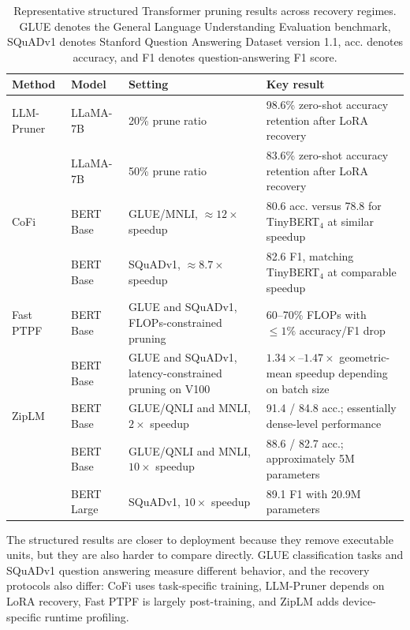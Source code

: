 \begin{table}[H]
	\centering
	\caption{Representative structured Transformer pruning results across recovery regimes. GLUE denotes the General Language Understanding Evaluation benchmark, SQuADv1 denotes Stanford Question Answering Dataset version 1.1, acc. denotes accuracy, and F1 denotes question-answering F1 score.}
	\label{tab:structured_summary}
	\begin{tabular}{@{}llp{4.4cm}p{4.7cm}@{}}
		\toprule
		\textbf{Method} & \textbf{Model} & \textbf{Setting} & \textbf{Key result} \\
		\midrule
		LLM-Pruner \cite{ma2023llmpruner}
		  & LLaMA-7B & 20\% prune ratio & 98.6\% zero-shot accuracy retention after LoRA recovery \\
		  & LLaMA-7B & 50\% prune ratio & 83.6\% zero-shot accuracy retention after LoRA recovery \\
		\midrule
		CoFi \cite{xia2022structured}
		  & BERT Base & GLUE/MNLI, $\approx 12{\times}$ speedup & 80.6 acc. versus 78.8 for TinyBERT$_4$ at similar speedup \\
		  & BERT Base & SQuADv1, $\approx 8.7{\times}$ speedup & 82.6 F1, matching TinyBERT$_4$ at comparable speedup \\
		\midrule
		Fast PTPF \cite{kwon2022fast}
		  & BERT Base & GLUE and SQuADv1, FLOPs-constrained pruning & 60--70\% FLOPs with $\leq 1\%$ accuracy/F1 drop \\
		  & BERT Base & GLUE and SQuADv1, latency-constrained pruning on V100 & $1.34{\times}$--$1.47{\times}$ geometric-mean speedup depending on batch size \\
		\midrule
		ZipLM \cite{kurtic2023ziplm}
		  & BERT Base & GLUE/QNLI and MNLI, $2{\times}$ speedup & 91.4 / 84.8 acc.; essentially dense-level performance \\
		  & BERT Base & GLUE/QNLI and MNLI, $10{\times}$ speedup & 88.6 / 82.7 acc.; approximately 5M parameters \\
		  & BERT Large & SQuADv1, $10{\times}$ speedup & 89.1 F1 with 20.9M parameters \\
		\bottomrule
	\end{tabular}
\end{table}

The structured results are closer to deployment because they remove executable units, but they are also harder to compare directly. GLUE classification tasks and SQuADv1 question answering measure different behavior, and the recovery protocols also differ: CoFi uses task-specific training, LLM-Pruner depends on LoRA recovery, Fast PTPF is largely post-training, and ZipLM adds device-specific runtime profiling.

